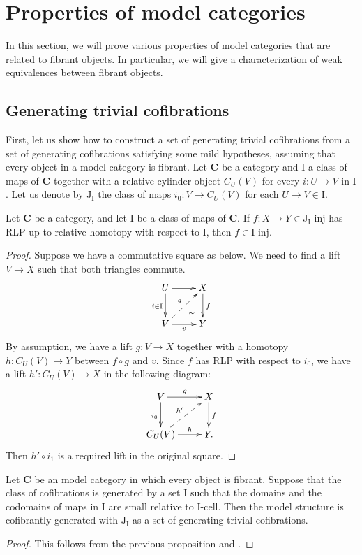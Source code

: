 \documentclass{tac}
\theoremstyle{definition}
\newcommand{\cat}[1]{\mathbf{#1}}
\newcommand{\C}{\cat{C}}
\newcommand{\I}{\mathrm{I}}
\newcommand{\J}{\mathrm{J}}
\newcommand{\class}[2]{#1\text{-}\mathrm{#2}}
\newcommand{\Iinj}[1][\I]{\class{#1}{inj}}
\newcommand{\Icell}[1][\I]{\class{#1}{cell}}
\newcommand{\Jinj}[1][]{\Iinj[\J#1]}
\newcommand{\cyli}{i}
\begin{document}
\section{Properties of model categories}

In this section, we will prove various properties of model categories that are related to fibrant objects.
In particular, we will give a characterization of weak equivalences between fibrant objects.

\subsection{Generating trivial cofibrations}

First, let us show how to construct a set of generating trivial cofibrations from a set of generating cofibrations satisfying some mild hypotheses,
assuming that every object in a model category is fibrant.
Let $\C$ be a category and $\I$ a class of maps of $\C$ together with a relative cylinder object $C_U(V)$ for every $i : U \to V$ in $\I$.
Let us denote by $\J_\I$ the class of maps $\cyli_0 : V \to C_U(V)$ for each $U \to V \in \I$.

\begin{prop}
Let $\C$ be a category, and let $\I$ be a class of maps of $\C$.
If $f : X \to Y \in \Jinj[_\I]$ has RLP up to relative homotopy with respect to $\I$, then $f \in \Iinj$.
\end{prop}
\begin{proof}
Suppose we have a commutative square as below.
We need to find a lift $V \to X$ such that both triangles commute.
\[ \xymatrix{ U \ar[d]_{i \in \I} \ar[r] \ar@{}[dr]|(.7){\sim} & X \ar[d]^f \\
              V \ar[r]_v \ar@{-->}[ur]^g                       & Y
            } \]
By assumption, we have a lift $g : V \to X$ together with
a homotopy $h : C_U(V) \to Y$ between $f \circ g$ and $v$.
Since $f$ has RLP with respect to $\cyli_0$, we have a lift $h' : C_U(V) \to X$ in the following diagram:
\[ \xymatrix{ V \ar[r]^g \ar[d]_{\cyli_0}         & X \ar[d]^f \\
              C_U(V) \ar[r]^-h \ar@{-->}[ur]^{h'} & Y.
            } \]
Then $h' \circ \cyli_1$ is a required lift in the original square.
\end{proof}

\begin{cor}
Let $\C$ be an model category in which every object is fibrant.
Suppose that the class of cofibrations is generated by a set $\I$ such that
the domains and the codomains of maps in $\I$ are small relative to $\Icell$.
Then the model structure is cofibrantly generated with $\J_\I$ as a set of generating trivial cofibrations.
\end{cor}
\begin{proof}
This follows from the previous proposition and .
\end{proof}
\end{document}
